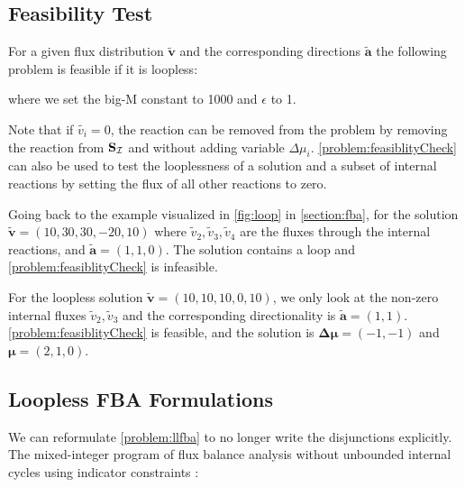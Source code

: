 \subsection{Feasibility Test} \label{section:feasibility_test}
For a given flux distribution $\boldsymbol{\tilde{v}}$ and the corresponding directions $\boldsymbol{\tilde{a}}$ the following problem is feasible if it is loopless:
\quad where we set the big-M constant to 1000 and $\epsilon$ to 1. 

Note that if $\tilde{v_i} = 0$, the reaction can be removed from the problem by removing the reaction from $\bold S_{\mathcal{I}}$ and without adding variable $\Delta \mu_i$. 
\cref{problem:feasiblityCheck} can also be used to test the looplessness of a solution and a subset of internal reactions by setting the flux of all other reactions to zero.

Going back to the example visualized in \cref{fig:loop} in \cref{section:fba}, for the solution $\boldsymbol{\tilde v} = (10, 30, 30, -20, 10)$ where $\tilde v_2, \tilde v_3, \tilde v_4$ are the fluxes through the internal reactions, and $\boldsymbol{\tilde a} = (1,1,0)$. The solution contains a loop and \cref{problem:feasiblityCheck} is infeasible. 

For the loopless solution $\boldsymbol{\tilde v} = (10, 10, 10, 0, 10)$, we only look at the non-zero internal fluxes $\tilde v_2, \tilde v_3$ and the corresponding directionality is $\boldsymbol{\tilde a} = (1,1)$. \cref{problem:feasiblityCheck} is feasible, and the solution is $\boldsymbol{\Delta \mu}=(-1, -1)$ and $\boldsymbol \mu = (2,1,0)$. 

\subsection{Loopless FBA Formulations} \label{section:llfba_variants}
We can reformulate \cref{problem:llfba} to no longer write the disjunctions explicitly.
The mixed-integer program of flux balance analysis without unbounded internal cycles using indicator constraints \cite{elimination_infeasible_loops}:

